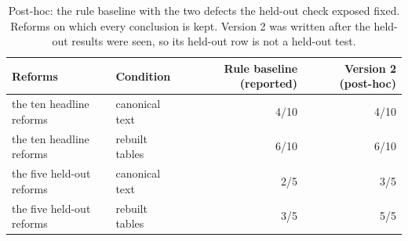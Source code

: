 \begin{table}[t]
\centering\small
\caption{Post-hoc: the rule baseline with the two defects the held-out check exposed fixed. Reforms on which every conclusion is kept. Version 2 was written after the held-out results were seen, so its held-out row is not a held-out test.}
\label{tab:rules_v2}
\begin{tabular}{llrr}
\toprule
Reforms & Condition & Rule baseline (reported) & Version 2 (post-hoc) \\
\midrule
the ten headline reforms & canonical text & 4/10 & 4/10 \\
the ten headline reforms & rebuilt tables & 6/10 & 6/10 \\
the five held-out reforms & canonical text & 2/5 & 3/5 \\
the five held-out reforms & rebuilt tables & 3/5 & 5/5 \\
\bottomrule
\end{tabular}
\end{table}
